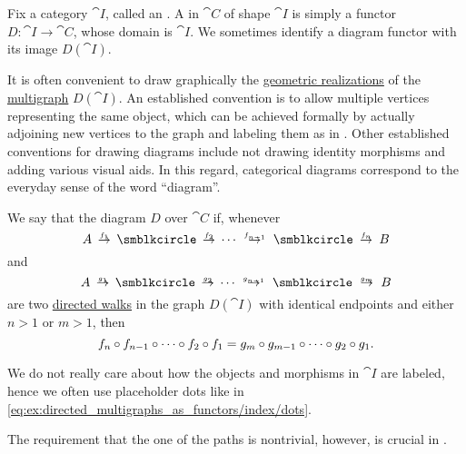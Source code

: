 \begin{definition}\label{def:categorical_diagram}
  Fix a category \( \cat{I} \), called an . A  in \( \cat{C} \) of shape \( \cat{I} \) is simply a functor \( D: \cat{I} \to \cat{C} \), whose domain is \( \cat{I} \). We sometimes identify a diagram functor with its image \( D(\cat{I}) \).

  It is often convenient to draw graphically the \hyperref[def:graph_geometric_realization]{geometric realizations} of the \hyperref[def:directed_multigraph]{multigraph} \( D(\cat{I}) \). An established convention is to allow multiple vertices representing the same object, which can be achieved formally by actually adjoining new vertices to the graph and labeling them as in . Other established conventions for drawing diagrams include not drawing identity morphisms and adding various visual aids. In this regard, categorical diagrams correspond to the everyday sense of the word \enquote{diagram}.

  We say that the diagram \( D \) over \( \cat{C} \)  if, whenever
  \begin{equation*}
    A \reloset {f_1} \to \anon \reloset {f_2} \to \cdots \reloset {f_{n-1}} \to \anon \reloset {f_n} \to B
  \end{equation*}
  and
  \begin{equation*}
    A \reloset {g_1} \to \anon \reloset {g_2} \to \cdots \reloset {g_{n-1}} \to \anon \reloset {g_m} \to B
  \end{equation*}
  are two \hyperref[def:graph_walk/directed]{directed walks} in the graph \( D(\cat{I}) \) with identical endpoints and either \( n > 1 \) or \( m > 1 \), then
  \begin{equation*}
    f_n \bincirc f_{n-1} \bincirc \cdots \bincirc f_2 \bincirc f_1
    =
    g_m \bincirc g_{m-1} \bincirc \cdots \bincirc g_2 \bincirc g_1.
  \end{equation*}

  We do not really care about how the objects and morphisms in \( \cat{I} \) are labeled, hence we often use placeholder dots like in \eqref{eq:ex:directed_multigraphs_as_functors/index/dots}.

  The requirement that the one of the paths is nontrivial, however, is crucial in .
\end{definition}

